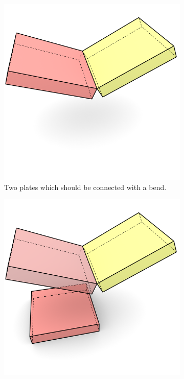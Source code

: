 \documentclass[../ClassicThesis.tex]{subfiles}
\begin{document}
\begin{figure}[h]
  \centering
  \begin{subfigure}[b]{0.49\textwidth}
    \centering
    \includegraphics[width=\textwidth]{07-traversing_along_bend_connections_01}
    \caption{Two plates which should be connected with a bend.}
    \label{fig:bend-matrix:1}
  \end{subfigure}
  \begin{subfigure}[b]{0.49\textwidth}
    \centering
    \includegraphics[width=1\textwidth]{07-traversing_along_bend_connections_02}

\end{subfigure}
\end{figure}
\end{document}
